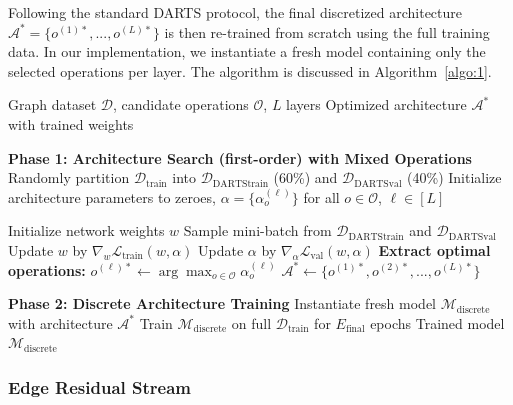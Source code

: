 \documentclass[lettersize,journal]{IEEEtran}
\begin{document}
Following the standard DARTS protocol, the final discretized architecture $\mathcal{A}^* = \{o^{(1)*}, ..., o^{(L)*}\}$ is then re-trained from scratch using the full training data. In our implementation, we instantiate a fresh model containing only the selected operations per layer. The algorithm is discussed in Algorithm~\ref{algo:1}.



\begin{algorithm}
\caption{DARTS-GT: Two-Phase Architecture Search}
\label{algo:1} 
\begin{algorithmic}[1]
\Require Graph dataset $\mathcal{D}$, candidate operations $\mathcal{O}$, $L$ layers
\Ensure Optimized architecture $\mathcal{A}^*$ with trained weights

\State \textbf{Phase 1: Architecture Search (first-order) with Mixed Operations}
\State Randomly partition $\mathcal{D}_{\text{train}}$ into $\mathcal{D}_{\text{DARTStrain}}$ (60\%) and $\mathcal{D}_{\text{DARTSval}}$ (40\%)
\State Initialize architecture parameters to zeroes, $\alpha = \{\alpha_o^{(\ell)}\}$ for all $o \in \mathcal{O}$, $\ell \in [L]$

\State Initialize network weights $w$
    \State Sample mini-batch from $\mathcal{D}_{\text{DARTStrain}}$ and $\mathcal{D}_{\text{DARTSval}}$
    \State Update $w$ by $\nabla_w \mathcal{L}_{\text{train}}(w, \alpha)$ 
\State Update $\alpha$ by $\nabla_\alpha \mathcal{L}_{\text{val}}(w, \alpha)$ 
\EndFor
\State \textbf{Extract optimal operations:}
    \State $o^{(\ell)*} \gets \arg\max_{o \in \mathcal{O}} \alpha_o^{(\ell)}$
\EndFor
\State $\mathcal{A}^* \gets \{o^{(1)*}, o^{(2)*}, ..., o^{(L)*}\}$

\State \textbf{Phase 2: Discrete Architecture Training}
\State Instantiate fresh model $\mathcal{M}_{\text{discrete}}$ with architecture $\mathcal{A}^*$
\State Train $\mathcal{M}_{\text{discrete}}$ on full $\mathcal{D}_{\text{train}}$ for $E_{\text{final}}$ epochs
\State \Return Trained model $\mathcal{M}_{\text{discrete}}$
\end{algorithmic}
\end{algorithm}

\subsubsection{Edge Residual Stream}
\end{document}
